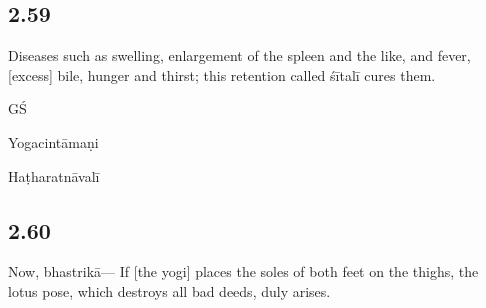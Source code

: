 \begin{ekdosis}
\begin{philcomm}[hp02_058]
\end{philcomm}

\subsection*{2.59}
\begin{translation}[hp02_059]
Diseases such as swelling, enlargement of the spleen and the like, and fever, [excess] bile, hunger and thirst; this retention called śītalī cures them.
\end{translation}

\begin{sources}[hp02_059]
GŚ

\begin{versinnote}
\end{versinnote}
\end{sources}

\begin{testimonia}[hp02_059]
Yogacintāmaṇi

\begin{versinnote}
\end{versinnote}

Haṭharatnāvalī

\begin{versinnote}
\end{versinnote}
\end{testimonia}

\begin{philcomm}[hp02_059]
\end{philcomm}

\subsection*{2.60}
\begin{translation}[hp02_060]
Now, bhastrikā---
If [the yogi] places the soles of both feet on the thighs, the lotus pose, which destroys all bad deeds, duly arises.
\end{translation}


\end{ekdosis}
